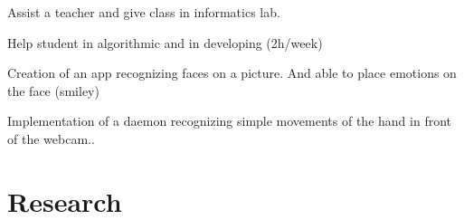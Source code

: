 \documentclass[letterpaper]{deedy-resume} %
\begin{document}
\begin{minipage}[t]{0.66\textwidth}
\sectionspace %



\begin{tightitemize}
    \item Assist a teacher and give class in informatics lab.
    \item Help student in algorithmic and in developing (2h/week)
\end{tightitemize}

\sectionspace %


% 
% 
 


\begin{tightitemize}
    \item Creation of an app recognizing faces on a picture. And able to place emotions on the face (smiley)
    \item Implementation of a daemon recognizing simple movements of the hand in front of the webcam..
\end{tightitemize}

\sectionspace %


\section{Research}



\end{minipage}
\end{document}
